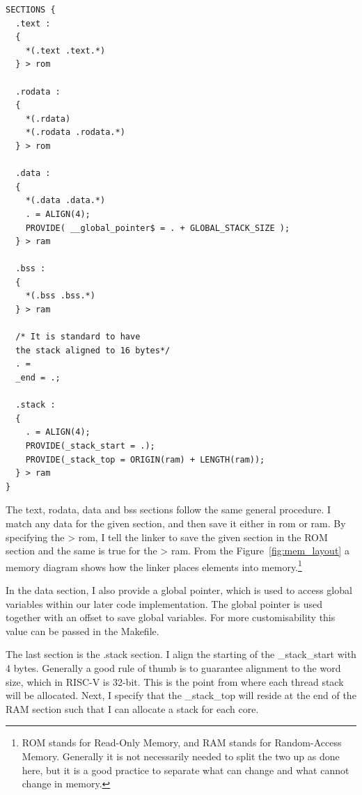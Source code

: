 \begin{lstlisting}[caption=Linker scripts SECTIONS.]
SECTIONS {
  .text :
  {
    *(.text .text.*)
  } > rom

  .rodata :
  {
    *(.rdata)
    *(.rodata .rodata.*)
  } > rom

  .data :
  {
    *(.data .data.*)
    . = ALIGN(4);
    PROVIDE( __global_pointer$ = . + GLOBAL_STACK_SIZE );
  } > ram

  .bss :
  {
    *(.bss .bss.*)
  } > ram

  /* It is standard to have
  the stack aligned to 16 bytes*/
  . =
  _end = .;

  .stack :
  {
    . = ALIGN(4);
    PROVIDE(_stack_start = .);
    PROVIDE(_stack_top = ORIGIN(ram) + LENGTH(ram));
  } > ram
}
\end{lstlisting}
The text, rodata, data and bss sections follow the same general procedure. I
match any data for the given section, and then save it either in rom or ram. By
specifying the > rom, I tell the linker to save the given section in the ROM
section and the same is true for the > ram. From the Figure~\ref{fig:mem_layout}
a memory diagram shows how the linker places elements into memory.\footnote{ROM
  stands for Read-Only Memory, and RAM stands for Random-Access Memory.
  Generally it is not necessarily needed to split the two up as done here, but
it is a good practice to separate what can change and what cannot change in
memory.}

In the data section, I also provide a global pointer, which is used to access
global variables within our later code implementation. The global pointer is
used together with an offset to save global variables. For more customisability
this value can be passed in the Makefile.

The last section is the .stack section. I align the starting of the
\_stack\_start with 4 bytes. Generally a good rule of thumb is to guarantee
alignment to the word size, which in RISC-V is 32-bit. This is the point from
where each thread stack will be allocated. Next, I specify that the
\_stack\_top will reside at the end of the RAM section such that I can allocate
a stack for each core.

